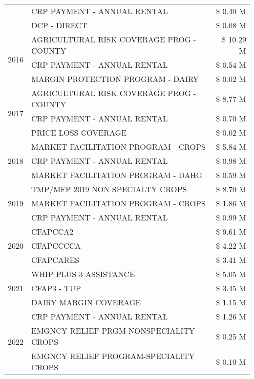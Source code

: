 \begin{tabular}{llr}
 & CRP PAYMENT - ANNUAL RENTAL & \$ 0.40 M \\
 & DCP - DIRECT & \$ 0.08 M \\
\cline{1-3}
\multirow[t]{3}{*}{2016} & AGRICULTURAL RISK COVERAGE PROG - COUNTY & \$ 10.29 M \\
 & CRP PAYMENT - ANNUAL RENTAL & \$ 0.54 M \\
 & MARGIN PROTECTION PROGRAM - DAIRY & \$ 0.02 M \\
\cline{1-3}
\multirow[t]{3}{*}{2017} & AGRICULTURAL RISK COVERAGE PROG - COUNTY & \$ 8.77 M \\
 & CRP PAYMENT - ANNUAL RENTAL & \$ 0.70 M \\
 & PRICE LOSS COVERAGE & \$ 0.02 M \\
\cline{1-3}
\multirow[t]{3}{*}{2018} & MARKET FACILITATION PROGRAM - CROPS & \$ 5.84 M \\
 & CRP PAYMENT - ANNUAL RENTAL & \$ 0.98 M \\
 & MARKET FACILITATION PROGRAM - DAHG & \$ 0.59 M \\
\cline{1-3}
\multirow[t]{3}{*}{2019} & TMP/MFP 2019 NON SPECIALTY CROPS & \$ 8.70 M \\
 & MARKET FACILITATION PROGRAM - CROPS & \$ 1.86 M \\
 & CRP PAYMENT - ANNUAL RENTAL & \$ 0.99 M \\
\cline{1-3}
\multirow[t]{3}{*}{2020} & CFAPCCA2 & \$ 9.61 M \\
 & CFAPCCCCA & \$ 4.22 M \\
 & CFAPCARES & \$ 3.41 M \\
\cline{1-3}
\multirow[t]{3}{*}{2021} & WHIP PLUS 3 ASSISTANCE & \$ 5.05 M \\
 & CFAP3 - TUP & \$ 3.45 M \\
 & DAIRY MARGIN COVERAGE & \$ 1.15 M \\
\cline{1-3}
\multirow[t]{3}{*}{2022} & CRP PAYMENT - ANNUAL RENTAL & \$ 1.26 M \\
 & EMGNCY RELIEF PRGM-NONSPECIALITY CROPS & \$ 0.25 M \\
 & EMGNCY RELIEF PROGRAM-SPECIALITY CROPS & \$ 0.10 M \\
\cline{1-3}
\bottomrule
\end{tabular}
